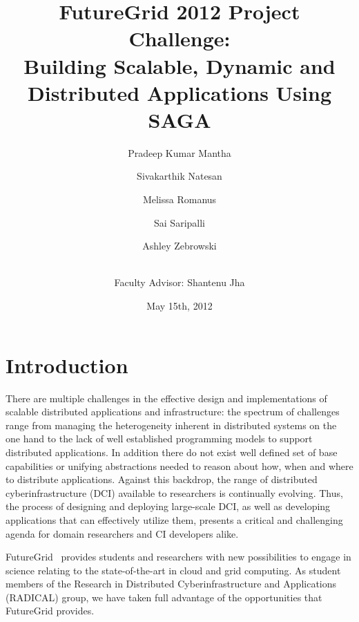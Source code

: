 \documentclass[]{paper}
\begin{document}
\title{FutureGrid 2012 Project Challenge:\\ Building Scalable, Dynamic and Distributed Applications Using SAGA}
\author{Pradeep Kumar Mantha 
  \and Sivakarthik Natesan 
  \and Melissa Romanus \\
  \and Sai Saripalli 
  \and Ashley Zebrowski 
  \and \\ \hspace{-3.35in} \large{Faculty Advisor: Shantenu Jha}\\
  }

\date{May 15th, 2012}
\maketitle


\section{Introduction}


There are multiple challenges in the effective design and implementations of scalable distributed applications and infrastructure: the spectrum of challenges range from managing the heterogeneity inherent in distributed systems on the one hand to the lack of well established programming models to support distributed applications. In addition there do not exist well defined set of base capabilities or unifying abstractions needed to reason about how, when and where to distribute applications. Against this backdrop, the range of distributed cyberinfrastructure (DCI) available to researchers is continually evolving.  Thus, the process of designing and deploying large-scale DCI, as well as developing applications that can effectively utilize them, presents a critical and challenging agenda for domain researchers and CI developers alike.

FutureGrid~\cite{fg} provides students and researchers with new possibilities to engage in science relating to the state-of-the-art in cloud and grid computing.  As student members of the Research in Distributed Cyberinfrastructure and Applications (RADICAL) group, we have taken full advantage of the opportunities that FutureGrid provides.
\end{document}
